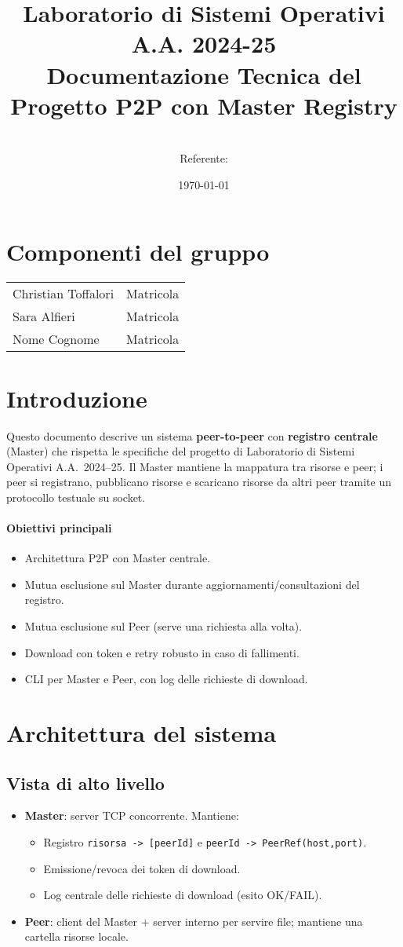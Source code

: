 \documentclass[a4paper,12pt]{article}
\title{\textbf{Laboratorio di Sistemi Operativi A.A. 2024-25}\\[4pt]
Documentazione Tecnica del Progetto P2P con Master Registry}
\author{\GroupName\\ \small Referente: \texttt{\ReferenteEmail}}
\date{\today}
\makeatletter
\newcommand{\Members}{%
  \begin{tabular}{@{}ll@{}}
  Christian Toffalori & Matricola \\
  Sara Alfieri         & Matricola \\
  Nome Cognome         & Matricola \\
  \end{tabular}
}
\makeatother
\begin{document}
\maketitle

\section*{Componenti del gruppo}
\Members

\tableofcontents
\newpage

\section{Introduzione}
Questo documento descrive un sistema \textbf{peer-to-peer} con \textbf{registro centrale} (Master) che rispetta le specifiche del progetto di Laboratorio di Sistemi Operativi A.A.\ 2024--25. Il Master mantiene la mappatura tra risorse e peer; i peer si registrano, pubblicano risorse e scaricano risorse da altri peer tramite un protocollo testuale su socket.

\paragraph{Obiettivi principali}
\begin{itemize}[nosep]
  \item Architettura P2P con Master centrale.
  \item Mutua esclusione sul Master durante aggiornamenti/consultazioni del registro.
  \item Mutua esclusione sul Peer (serve una richiesta alla volta).
  \item Download con token e retry robusto in caso di fallimenti.
  \item CLI per Master e Peer, con log delle richieste di download.
\end{itemize}

\section{Architettura del sistema}
\subsection{Vista di alto livello}
\begin{itemize}[nosep]
  \item \textbf{Master}: server TCP concorrente. Mantiene:
  \begin{itemize}[nosep]
    \item Registro \texttt{risorsa -> [peerId]} e \texttt{peerId -> PeerRef(host,port)}.
    \item Emissione/revoca dei token di download.
    \item Log centrale delle richieste di download (esito OK/FAIL).
  \end{itemize}
  \item \textbf{Peer}: client del Master + server interno per servire file; mantiene una cartella risorse locale. 
\end{itemize}
\end{document}
